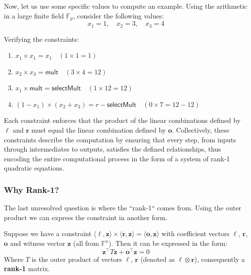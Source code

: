 \documentclass[../../book.tex]{subfiles}
\begin{document}
\begin{example}
    Now, let us use some specific values to compute an example. Using the arithmetic in a large finite
    field $\mathbb{F}_p$, consider the following values:
    \begin{equation*}
        x_1 = 1, \quad x_2 = 3, \quad x_3 = 4
    \end{equation*}

    Verifying the constraints:
    \begin{enumerate}
        \item \( x_1 \times x_1 = x_1 \quad (1 \times 1 = 1) \)
        \item \( x_2 \times x_3 = \mathsf{mult} \quad (3 \times 4 = 12) \)
        \item \( x_1 \times \mathsf{mult} = \mathsf{selectMult} \quad (1 \times 12 = 12) \)
        \item \( (1 - x_1) \times (x_2 + x_3) = r - \mathsf{selectMult} \quad (0 \times 7 = 12 - 12) \)
    \end{enumerate}
\end{example}

Each constraint enforces that the product of the linear combinations defined by $\boldsymbol{\ell}$ and $\boldsymbol{r}$ must
equal the linear combination defined by $\boldsymbol{o}$. Collectively, these constraints describe the 
computation by ensuring that every step, from inputs through intermediates to outputs, satisfies 
the defined relationships, thus encoding the entire computational process in the form of a system
of rank-1 quadratic equations.

\subsubsection{Why Rank-1?}
The last unresolved question is where the ``rank-1`` comes from. Using the outer
product we can express the constraint in another form.

\begin{lemma}
    Suppose we have a constraint $\langle \boldsymbol{\ell}, \mathbf{z}\rangle \times
    \langle \boldsymbol{r}, \mathbf{z}\rangle = \langle \boldsymbol{o}, \mathbf{z}
    \rangle$ with coefficient vectors $\boldsymbol{\ell}$, $\boldsymbol{r}$, $\boldsymbol{o}$
    and witness vector $\mathbf{z}$ (all from $\mathbb{F}^n$). Then it can be
    expressed in the form:
    \[ \mathbf{z}^{\top} T \mathbf{z} + \boldsymbol{o}^{\top} \mathbf{z} = 0 \]
    Where $T$ is the outer product of vectors $\boldsymbol{\ell}$, $\boldsymbol{r}$
    (denoted as $\boldsymbol{\ell} \otimes \boldsymbol{r}$), consequently a \textbf{rank-1}
    matrix.
\end{lemma}
\end{document}
